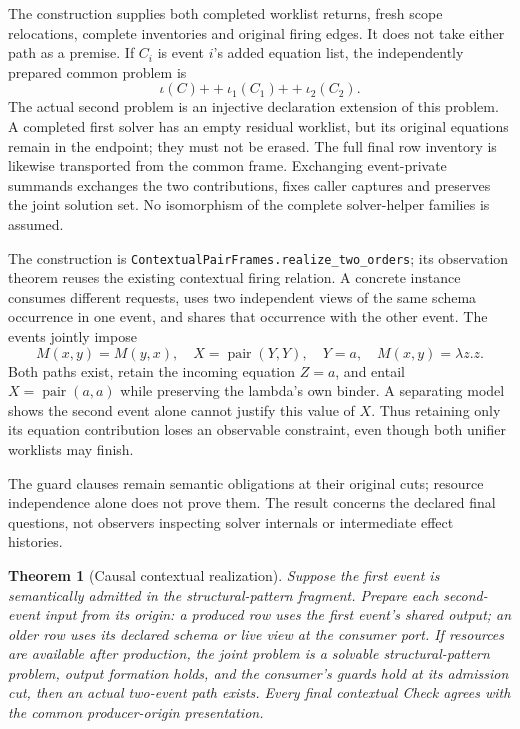 \documentclass[11pt]{article}
\newtheorem{theorem}{Theorem}
\newcommand{\code}[1]{\texttt{\small #1}}
\begin{document}
The construction supplies both completed worklist returns, fresh scope
relocations, complete inventories and original firing edges. It does not
take either path as a premise. If $C_i$ is event $i$'s added equation list,
the independently prepared common problem is
\[
  \iota(C)\mathbin{+\!+}\iota_1(C_1)\mathbin{+\!+}\iota_2(C_2).
\]
The actual second problem is an injective declaration extension of this
problem. A completed first solver has an empty residual worklist, but its
original equations remain in the endpoint; they must not be erased.
The full final row inventory is likewise transported from the common frame.
Exchanging event-private summands exchanges the two contributions, fixes
caller captures and preserves the joint solution set. No isomorphism of
the complete solver-helper families is assumed.

The construction is \code{ContextualPairFrames.realize\_two\_orders};
its observation theorem reuses the existing contextual firing relation.
A concrete instance consumes different requests, uses two independent
views of the same schema occurrence in one event, and shares that occurrence
with the other event. The events jointly impose
\[
 M(x,y)=M(y,x),\quad X=\operatorname{pair}(Y,Y),\quad
 Y=a,\quad M(x,y)=\lambda z.z.
\]
Both paths exist, retain the incoming equation $Z=a$, and entail
$X=\operatorname{pair}(a,a)$ while preserving the lambda's own binder.
A separating model shows the second event alone cannot justify this value
of $X$. Thus retaining only its equation contribution loses an observable
constraint, even though both unifier worklists may finish.

The guard clauses remain semantic obligations at their original cuts;
resource independence alone does not prove them. The result concerns the
declared final questions, not observers inspecting solver internals or
intermediate effect histories.

\begin{theorem}[Causal contextual realization]
Suppose the first event is semantically admitted in the structural-pattern
fragment. Prepare each second-event input from its origin: a produced row
uses the first event's shared output; an older row uses its declared schema or
live view at the consumer port. If resources are available after production,
the joint problem is a solvable structural-pattern problem, output formation
holds, and the consumer's guards hold at its admission cut, then an actual
two-event path exists. Every final contextual Check agrees with the common
producer-origin presentation.
\end{theorem}
\end{document}
